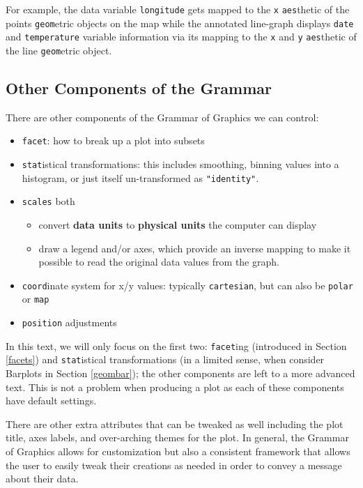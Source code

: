 \documentclass[]{tufte-book}
\providecommand{\tightlist}{%
  \setlength{\itemsep}{0pt}\setlength{\parskip}{0pt}}
\begin{document}
For example, the data variable \texttt{longitude} gets mapped to the
\texttt{x} \texttt{aes}thetic of the points \texttt{geom}etric objects
on the map while the annotated line-graph displays \texttt{date} and
\texttt{temperature} variable information via its mapping to the
\texttt{x} and \texttt{y} \texttt{aes}thetic of the line
\texttt{geom}etric object.

\subsection{Other Components of the
Grammar}\label{other-components-of-the-grammar}

There are other components of the Grammar of Graphics we can control:

\begin{itemize}
\tightlist
\item
  \texttt{facet}: how to break up a plot into subsets
\item
  \texttt{stat}istical transformations: this includes smoothing, binning
  values into a histogram, or just itself un-transformed as
  \texttt{"identity"}.
\item
  \texttt{scales} both

  \begin{itemize}
  \tightlist
  \item
    convert \textbf{data units} to \textbf{physical units} the computer
    can display
  \item
    draw a legend and/or axes, which provide an inverse mapping to make
    it possible to read the original data values from the graph.
  \end{itemize}
\item
  \texttt{coord}inate system for x/y values: typically
  \texttt{cartesian}, but can also be \texttt{polar} or \texttt{map}
\item
  \texttt{position} adjustments
\end{itemize}

In this text, we will only focus on the first two: \texttt{facet}ing
(introduced in Section \ref{facets}) and \texttt{stat}istical
transformations (in a limited sense, when consider Barplots in Section
\ref{geombar}); the other components are left to a more advanced text.
This is not a problem when producing a plot as each of these components
have default settings.

There are other extra attributes that can be tweaked as well including
the plot title, axes labels, and over-arching themes for the plot. In
general, the Grammar of Graphics allows for customization but also a
consistent framework that allows the user to easily tweak their
creations as needed in order to convey a message about their data.
\end{document}
